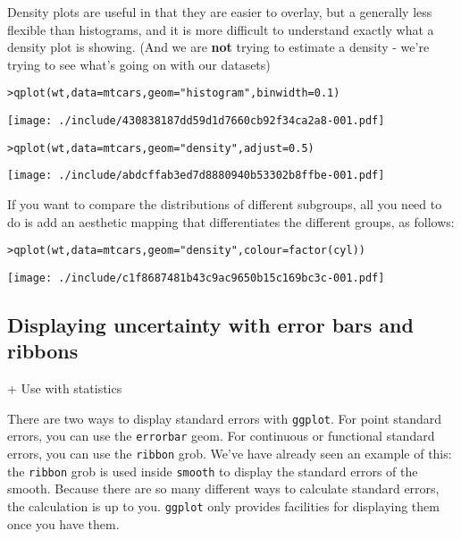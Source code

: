 Density plots are useful in that they are easier to overlay, but a generally less flexible than histograms, and it is more difficult to understand exactly what a density plot is showing.  (And we are {\bf not} trying to estimate a density - we're trying to see what's going on with our datasets)

\begin{alltt}
> qplot(wt, data = mtcars, geom = "histogram", binwidth = 0.1)
\end{alltt}
\texttt{[image: ./include/430838187dd59d1d7660cb92f34ca2a8-001.pdf]}
\begin{alltt}

> qplot(wt, data = mtcars, geom = "density", adjust = 0.5)
\end{alltt}
\texttt{[image: ./include/abdcffab3ed7d8880940b53302b8ffbe-001.pdf]}
\begin{alltt}

\end{alltt}

If you want to compare the distributions of different subgroups, all you need to do is add an aesthetic mapping that differentiates the different groups, as follows:

\begin{alltt}
> qplot(wt, data = mtcars, geom = "density", colour = factor(cyl))
\end{alltt}
\texttt{[image: ./include/c1f8687481b43c9ac9650b15c169bc3c-001.pdf]}
\begin{alltt}

\end{alltt}

\subsection{Displaying uncertainty with error bars and ribbons}\label{sub:error_bars}

+ Use with statistics

There are two ways to display standard errors with {\tt ggplot}.  For point standard errors, you can use the {\tt errorbar} geom.  For continuous or functional standard errors, you can use the {\tt ribbon} grob.  We've have already seen an example of this: the {\tt ribbon} grob is used inside {\tt smooth} to display the standard errors of the smooth.  Because there are so many different ways to calculate standard errors, the calculation is up to you.  {\tt ggplot} only provides facilities for displaying them once you have them.

